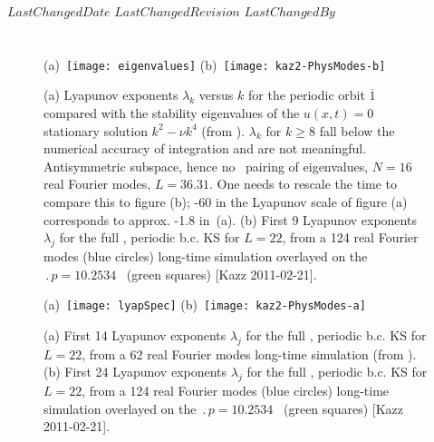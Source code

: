 \ifsvnmulti
 {$LastChangedDate$}
 {$LastChangedRevision$} {$LastChangedBy$}
\fi

\chapter{\KS}
\label{sect:LyapKS}

\begin{figure}
 (a)~\texttt{[image: eigenvalues]}
 (b)~\texttt{[image: kaz2-PhysModes-b]}
\caption{
(a)
Lyapunov exponents $\lambda_k$ versus $k$ for the periodic
orbit $\overline{1}$ compared with  the stability eigenvalues
of the $u(x,t)=0$ stationary solution $k^2- \nu k^4$ (from
). $\lambda_k$ for $k \geq 8$ fall
below the numerical accuracy of integration and are not
meaningful. Antisymmetric subspace,
hence no \ pairing of eigenvalues, $N=16$ real Fourier
modes, $L=36.31$. One needs to rescale the time to compare
this to figure (b); -60 in the Lyapunov scale of figure (a)
corresponds to approx. -1.8 in \,(a).
(b)
First 9 Lyapunov exponents $\lambda_j$ for the full
\statesp, periodic b.c. KS for $L=22$, from a 124 real Fourier
modes (blue circles) long-time simulation overlayed on
the $\period{p}=10.2534$ \po\ (green squares) [Kazz 2011-02-21].
}
\label{fig:lyapSpec1}
\end{figure}

\begin{figure}
 (a)~\texttt{[image: lyapSpec]}
 (b)~\texttt{[image: kaz2-PhysModes-a]}
\caption{
(a)
First 14 Lyapunov exponents $\lambda_j$ for the full
\statesp, periodic b.c. KS for $L=22$, from a 62 real Fourier
modes long-time simulation (from ).
(b)
First 24 Lyapunov exponents $\lambda_j$ for the full
\statesp, periodic b.c. KS for $L=22$, from a 124 real Fourier
modes (blue circles) long-time simulation overlayed on
the $\period{p}=10.2534$ \po\ (green squares) [Kazz 2011-02-21].
}
\label{fig:lyapSpec}
\end{figure}

